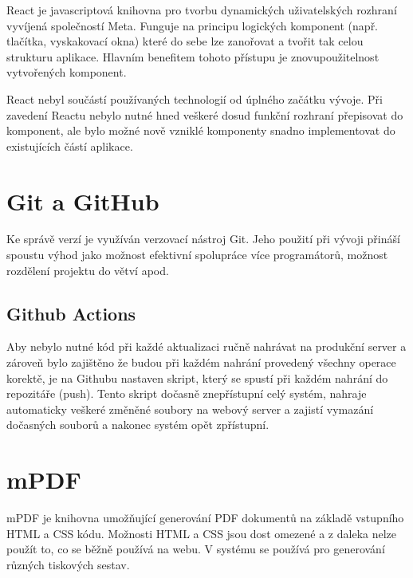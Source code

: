 React je javascriptová knihovna pro tvorbu dynamických uživatelských rozhraní vyvíjená společností Meta. \cite{react} Funguje na principu logických komponent (např. tlačítka, vyskakovací okna) které do sebe lze zanořovat a tvořit tak celou strukturu aplikace. Hlavním benefitem tohoto přístupu je znovupoužitelnost vytvořených komponent.

React nebyl součástí používaných technologií od úplného začátku vývoje. Při zavedení Reactu nebylo nutné hned veškeré dosud funkční rozhraní přepisovat do komponent, ale bylo možné nově vzniklé komponenty snadno implementovat do existujících částí aplikace.

\section{Git a GitHub}

Ke správě verzí je využíván verzovací nástroj Git. Jeho použití při vývoji přináší spoustu výhod jako možnost efektivní spolupráce více programátorů, možnost rozdělení projektu do větví apod.

\subsection{Github Actions}

Aby nebylo nutné kód při každé aktualizaci ručně nahrávat na produkční server a zároveň bylo zajištěno že budou při každém nahrání provedený všechny operace korektě, je na Githubu nastaven skript, který se spustí při každém nahrání do repozitáře (push). Tento skript dočasně znepřístupní celý systém, nahraje automaticky veškeré změněné soubory na webový server a zajistí vymazání dočasných souborů a nakonec systém opět zpřístupní.


\section{mPDF}

mPDF je knihovna umožňující generování PDF dokumentů na základě vstupního HTML a CSS kódu. Možnosti HTML a CSS jsou dost omezené a z daleka nelze použít to, co se běžně používá na webu. V systému se používá pro generování různých tiskových sestav.




